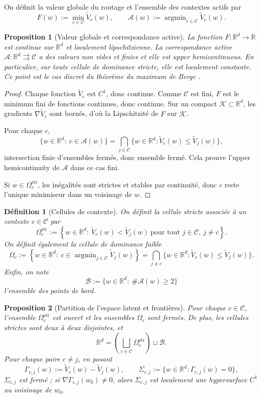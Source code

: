 \documentclass[11pt,a4paper]{article}
\newtheorem{definition}{Définition}[section]
\newtheorem{proposition}{Proposition}[section]
\DeclareMathOperator{\argmin}{argmin}
\newcommand{\R}{\mathbb R}
\newcommand{\Ccal}{\mathcal C}
\newcommand{\Acal}{\mathcal A}
\newcommand{\Bcal}{\mathcal B}
\begin{document}
On définit la valeur globale du routage et l'ensemble des contextes actifs par
\[
F(w):=\min_{c\in\Ccal}\widetilde V_c(w),
\qquad
\Acal(w):=\argmin_{c\in\Ccal}\widetilde V_c(w).
\]

\begin{proposition}[Valeur globale et correspondance active]
La fonction \(F:\R^d\to\R\) est continue sur \(\R^d\) et localement lipschitzienne. La correspondance active \(\Acal:\R^d\rightrightarrows\Ccal\) a des valeurs non vides et finies et elle est upper hemicontinuous. En particulier, sur toute cellule de dominance stricte, elle est localement constante. Ce point est le cas discret du théorème du maximum de Berge \cite{Berge1963}.
\end{proposition}

\begin{proof}
Chaque fonction \(\widetilde V_c\) est \(C^1\), donc continue. Comme \(\Ccal\) est fini, \(F\) est le minimum fini de fonctions continues, donc continue. Sur un compact \(\mathcal K\subset\R^d\), les gradients \(\nabla\widetilde V_c\) sont bornés, d'où la Lipschitzité de \(F\) sur \(\mathcal K\).

Pour chaque \(c\),
\[
\{w\in\R^d:\ c\in\Acal(w)\}
=
\bigcap_{j\in\Ccal}\{w\in\R^d:\widetilde V_c(w)\le \widetilde V_j(w)\},
\]
intersection finie d'ensembles fermés, donc ensemble fermé. Cela prouve l'upper hemicontinuity de \(\Acal\) dans ce cas fini.

Si \(w\in\Omega_c^{\mathrm{str}}\), les inégalités sont strictes et stables par continuité, donc \(c\) reste l'unique minimiseur dans un voisinage de \(w\).
\end{proof}

\begin{definition}[Cellules de contexte]
On définit la cellule stricte associée à un contexte \(c\in\Ccal\) par
\[
\Omega_c^{\mathrm{str}}:=\left\{w\in\R^d:\ \widetilde V_c(w)<\widetilde V_j(w)\ \text{pour tout }j\in\Ccal,\ j\neq c\right\}.
\]
On définit également la cellule de dominance faible
\[
\Omega_c:=\left\{w\in\R^d:\ c\in\argmin_{j\in\Ccal}\widetilde V_j(w)\right\}
=
\bigcap_{j\neq c}\{w\in\R^d:\widetilde V_c(w)\le \widetilde V_j(w)\}.
\]
Enfin, on note
\[
\Bcal:=\{w\in\R^d:\ \#\Acal(w)\ge 2\}
\]
l'ensemble des points de bord.
\end{definition}

\begin{proposition}[Partition de l'espace latent et frontières]
Pour chaque \(c\in\Ccal\), l'ensemble \(\Omega_c^{\mathrm{str}}\) est ouvert et les ensembles \(\Omega_c\) sont fermés. De plus, les cellules strictes sont deux à deux disjointes, et
\[
\R^d=\left(\bigsqcup_{c\in\Ccal}\Omega_c^{\mathrm{str}}\right)\sqcup \Bcal.
\]
Pour chaque paire \(c\neq j\), en posant
\[
\Gamma_{c,j}(w):=\widetilde V_c(w)-\widetilde V_j(w),
\qquad
\Sigma_{c,j}:=\{w\in\R^d:\Gamma_{c,j}(w)=0\},
\]
\(\Sigma_{c,j}\) est fermé ; si \(\nabla\Gamma_{c,j}(w_0)\neq 0\), alors \(\Sigma_{c,j}\) est localement une hypersurface \(C^1\) au voisinage de \(w_0\).
\end{proposition}
\end{document}
